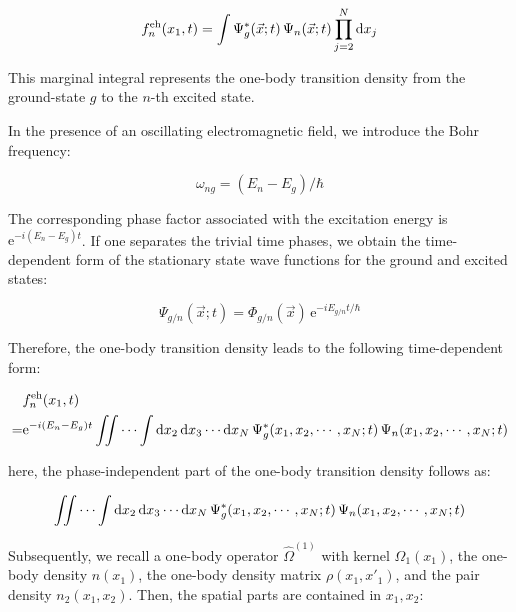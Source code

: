 \begin{equation}
f_n^\mathrm{eh}(x_1,t)=\int\Psi_g^*(\vec{x};t)\,\Psi_n(\vec{x};t)\prod^N_{j=2}\mathrm{d}{x_j}
\label{one_body_transition_quantity_compact}
\end{equation}

This marginal integral represents the one-body transition density from the ground-state $g$ to the $n$-th excited state.

In the presence of an oscillating electromagnetic field, we introduce the Bohr frequency:

\begin{equation}
\omega_{ng}=(E_n-E_g)/\hbar
\label{Bohr_frequency}
\end{equation}

The corresponding phase factor associated with the excitation energy is $\mathrm{e}^{-i(E_n-E_g)t}$.
If one separates the trivial time phases, we obtain the time-dependent form of the stationary state wave functions for the ground and excited states:

\begin{equation}
    \Psi_{g/n}(\vec{x};t)=\Phi_{g/n}(\vec{x})\,\mathrm{e}^{-iE_{g/n}t/\hbar}
\label{time_dep_eigenstate}
\end{equation}

Therefore, the one-body transition density leads to the following time-dependent form:

\begin{equation}
\begin{aligned}
    & f_n^\mathrm{eh}(x_1,t)\\
    =& \mathrm{e}^{-i(E_n-E_g)t}\iint\cdots\int\mathrm{d}{x_2}\,\mathrm{d}{x_3}\cdots\mathrm{d}{x_N}\,\Psi_g^*(x_1,x_2,\cdots,x_N;t)\,\Psi_n(x_1,x_2,\cdots,x_N;t)
\end{aligned}
\label{mod_transition_one-body}
\end{equation}

here, the phase-independent part of the one-body transition density follows as:

\begin{equation}
    \iint\cdots\int\mathrm{d}{x_2}\,\mathrm{d}{x_3}\cdots\mathrm{d}{x_N}\,\Psi_g^*(x_1,x_2,\cdots,x_N;t)\,\Psi_n(x_1,x_2,\cdots,x_N;t)
\label{transition_amplitude}
\end{equation}

Subsequently, we recall a one-body operator $\hat{\Omega}^{(1)}$ with kernel $\Omega_1(x_1)$,
the one-body density $n(x_1)$,
the one-body density matrix $\rho(x_1,x'_1)$,
and the pair density $n_2(x_1,x_2)$.
Then, the spatial parts are contained in $x_1,x_2$:

